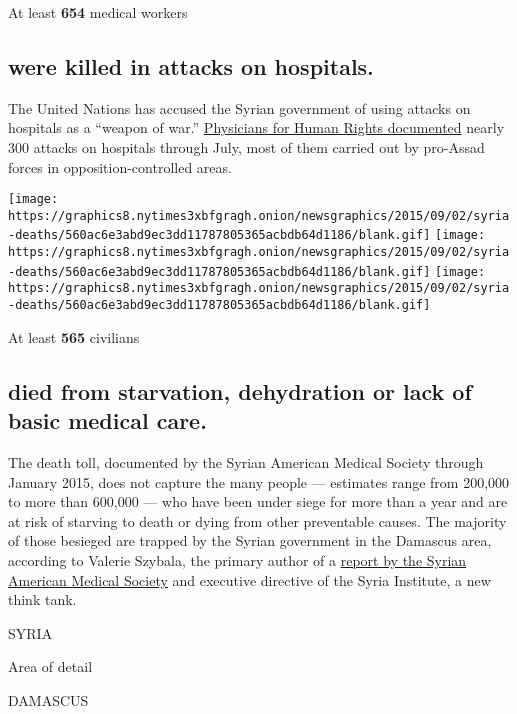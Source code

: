 At least \textbf{654} medical workers

\hypertarget{were-killed-in-attacks-on-hospitals}{%
\subsection{were killed in attacks on
hospitals.}\label{were-killed-in-attacks-on-hospitals}}

The United Nations has accused the Syrian government of using attacks on
hospitals as a ``weapon of war.''
\href{https://s3.amazonaws.com/PHR_syria_map/web/index.html}{Physicians
for Human Rights documented} nearly 300 attacks on hospitals through
July, most of them carried out by pro-Assad forces in
opposition-controlled areas.

\texttt{[image: https://graphics8.nytimes3xbfgragh.onion/newsgraphics/2015/09/02/syria-deaths/560ac6e3abd9ec3dd11787805365acbdb64d1186/blank.gif]}
\texttt{[image: https://graphics8.nytimes3xbfgragh.onion/newsgraphics/2015/09/02/syria-deaths/560ac6e3abd9ec3dd11787805365acbdb64d1186/blank.gif]}
\texttt{[image: https://graphics8.nytimes3xbfgragh.onion/newsgraphics/2015/09/02/syria-deaths/560ac6e3abd9ec3dd11787805365acbdb64d1186/blank.gif]}

At least \textbf{565} civilians

\hypertarget{died-from-starvation-dehydration-or-lack-of-basic-medical-care}{%
\subsection{died from starvation, dehydration or lack of basic medical
care.}\label{died-from-starvation-dehydration-or-lack-of-basic-medical-care}}

The death toll, documented by the Syrian American Medical Society
through January 2015, does not capture the many people --- estimates
range from 200,000 to more than 600,000 --- who have been under siege
for more than a year and are at risk of starving to death or dying from
other preventable causes. The majority of those besieged are trapped by
the Syrian government in the Damascus area, according to Valerie
Szybala, the primary author of a
\href{http://syriaundersiege.org/wp-content/uploads/2015/03/For-web-_REPORT.pdf}{report
by the Syrian American Medical Society} and executive directive of the
Syria Institute, a new think tank.

SYRIA

Area of detail

DAMASCUS

